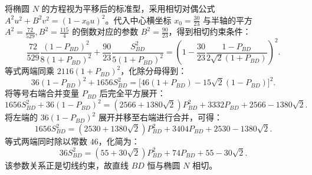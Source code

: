 \begin{solution}
将椭圆 $N$ 的方程视为平移后的标准型，采用相切对偶公式 $A^2 u^2 + B^2 v^2 = (1 - x_0 u)^2$。代入中心横坐标 $x_0 = \frac{30}{23}$ 与半轴的平方 $A^2 = \frac{72}{529}, B^2 = \frac{115}{4}$ 的倒数对应的参数 $B^2 = \frac{90}{23}$，得到相切约束条件：
\[ \frac{72}{529}\frac{(1-P_{BD})^2}{8(1+P_{BD})^2} + \frac{90}{23}\frac{S_{BD}^2}{5(1+P_{BD})^2} = \left( 1 - \frac{30}{23}\frac{1-P_{BD}}{2\sqrt{2}(1+P_{BD})} \right)^2. \]
等式两端同乘 $2116(1+P_{BD})^2$，化除分母得到：
\[ 36(1-P_{BD})^2 + 1656 S_{BD}^2 = \big[ 46(1+P_{BD}) - 15\sqrt{2}(1-P_{BD}) \big]^2. \]
将等号右端合并变量 $P_{BD}$ 后完全平方展开：
\[ 1656 S_{BD}^2 + 36(1-P_{BD})^2 = (2566+1380\sqrt{2}) P_{BD}^2 + 3332 P_{BD} + 2566-1380\sqrt{2}. \]
将左端的 $36(1-P_{BD})^2$ 展开并移至右端进行合并，可得：
\[ 1656 S_{BD}^2 = (2530+1380\sqrt{2}) P_{BD}^2 + 3404 P_{BD} + 2530-1380\sqrt{2}. \]
等式两端同时除以常数 $46$，化简为：
\[ 36 S_{BD}^2 = (55+30\sqrt{2}) P_{BD}^2 + 74 P_{BD} + 55-30\sqrt{2}. \]
该参数关系正是切线约束，故直线 $BD$ 恒与椭圆 $N$ 相切。
\end{solution}

